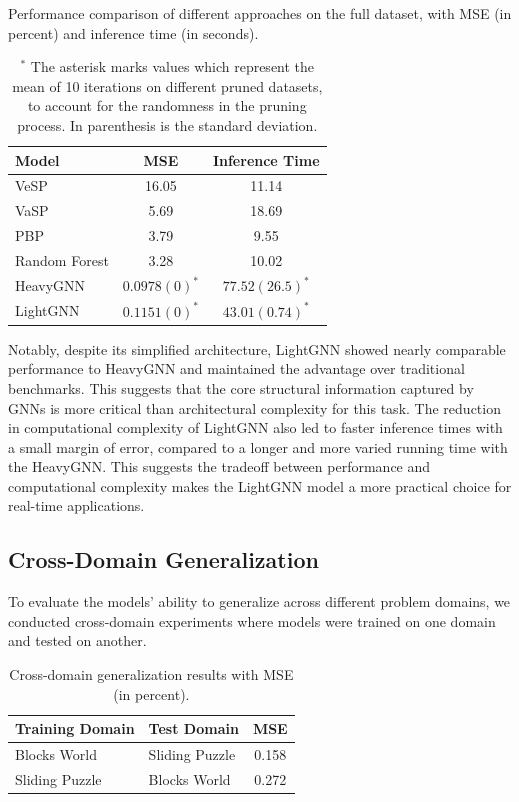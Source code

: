 \documentclass[letterpaper]{article}
\begin{document}
\begin{table}[t]
    \centering
    \caption{Performance comparison of different approaches on the full dataset, with MSE (in percent) and inference time (in seconds).}
    \label{tab:performance}
    \begin{tabular}{|l|c|c|}
    \hline
    \textbf{Model} & \textbf{MSE} & \textbf{Inference Time}\\
    \hline
    VeSP & 16.05 & 11.14 \\
    VaSP & 5.69 & 18.69 \\
    PBP & 3.79 & 9.55 \\
    Random Forest & 3.28 & 10.02 \\
    HeavyGNN & $0.0978 (0)^{\ast}$ & $77.52 (26.5)^{\ast}$ \\
    LightGNN & $0.1151 (0)^{\ast}$ & $43.01 (0.74)^{\ast}$ \\
    \hline
    \end{tabular}
    \vspace{0.5em}
    \caption*{$^{\ast}$ The asterisk marks values which represent the mean of 10 iterations on different pruned datasets, to account for the randomness in the pruning process. In parenthesis is the standard deviation.}
    \vspace{-2em}
\end{table}

Notably, despite its simplified architecture, LightGNN showed nearly comparable performance to HeavyGNN and maintained the advantage over traditional benchmarks. This suggests that the core structural information captured by GNNs is more critical than architectural complexity for this task.
The reduction in computational complexity of LightGNN also led to faster inference times with a small margin of error, compared to a longer and more varied running time with the HeavyGNN. This suggests the tradeoff between performance and computational complexity makes the LightGNN model a more practical choice for real-time applications.

\subsection{Cross-Domain Generalization}

To evaluate the models' ability to generalize across different problem domains, we conducted cross-domain experiments where models were trained on one domain and tested on another.

\begin{table}[H]
    \centering
    \caption{Cross-domain generalization results with MSE (in percent).}
    \label{tab:cross_domain}
    \begin{tabular}{|l|l|c|}
    \hline
    \textbf{Training Domain} & \textbf{Test Domain} & \textbf{MSE} \\
    \hline
    Blocks World & Sliding Puzzle & 0.158 \\
    Sliding Puzzle & Blocks World & 0.272 \\
    \hline
    \end{tabular}
\end{table}
\end{document}
